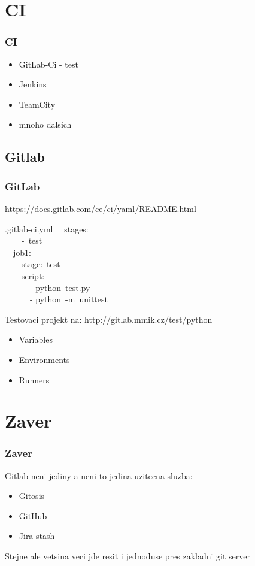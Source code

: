 \documentclass{beamer}
\begin{document}
\section{CI}
\begin{frame}
 \frametitle{CI}
 \begin{itemize}
  \item GitLab-Ci - test
  \item Jenkins
  \item TeamCity
  \item mnoho dalsich
 \end{itemize}
\end{frame}

\subsection{Gitlab}
\begin{frame}
 \frametitle{GitLab}
 https://docs.gitlab.com/ce/ci/yaml/README.html
\begin{block}{.gitlab-ci.yml}
~~stages:\\
~~~~-~test\\
~~job1:\\
~~~~stage:~test\\
~~~~script:\\
~~~~~~- python~test.py\\
~~~~~~- python~-m~unittest
\end{block}
\vspace{0.5cm}

 Testovaci projekt na: http://gitlab.mmik.cz/test/python
 
 \begin{itemize}
  \item Variables
  \item Environments
  \item Runners
 \end{itemize}
\end{frame}



\section{Zaver}
\begin{frame}
 \frametitle{Zaver}
 Gitlab neni jediny a neni to jedina uzitecna sluzba:
 
 \begin{itemize}
  \item Gitosis
  \item GitHub
  \item Jira stash
 \end{itemize} 
 Stejne ale vetsina veci jde resit i jednoduse pres zakladni git server 
\end{frame}
\end{document}
